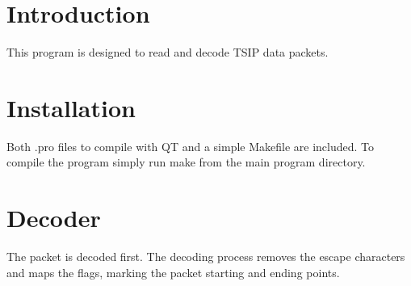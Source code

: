 \hypertarget{index_intro_sec}{}\section{Introduction}\label{index_intro_sec}
This program is designed to read and decode T\+S\+IP data packets.\hypertarget{index_install_sec}{}\section{Installation}\label{index_install_sec}
Both .pro files to compile with QT and a simple Makefile are included. To compile the program simply run make from the main program directory.\hypertarget{index_Decoder}{}\section{Decoder}\label{index_Decoder}
The packet is decoded first. The decoding process removes the escape characters and maps the flags, marking the packet starting and ending points.


